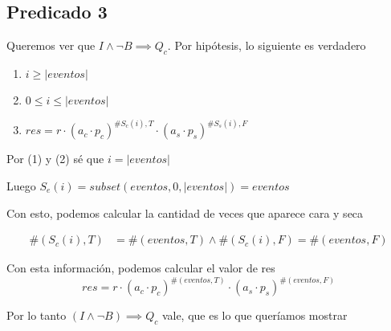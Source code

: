 \documentclass[../document.tex]{subfiles}
\begin{document}
\subsection*{Predicado 3}

Queremos ver que $I\land \neg B \implies Q_c$. Por hipótesis, lo siguiente es verdadero

\begin{enumerate}
    \item $i \geq |eventos|$
    \item $0\leq i \leq |eventos|$
    \item $res=r\cdot (a_c\cdot p_c)^{\#S_c(i),T}\cdot (a_s\cdot p_s)^{\#S_s(i),F}$
\end{enumerate}

Por (1) y (2) sé que $i=|eventos|$

Luego $S_e(i)=subset(eventos, 0, |eventos|)=eventos$

Con esto, podemos calcular la cantidad de veces que aparece cara y seca 

\begin{equation*}
\begin{split}
    \#(S_c(i),T)&=\#(eventos,T)\land \#(S_c(i),F)=\#(eventos,F)
\end{split}
\end{equation*}

Con esta información, podemos calcular el valor de res
\begin{equation*}
res=r\cdot (a_c\cdot p_c)^{\#(eventos,T)}\cdot (a_s\cdot p_s)^{\#(eventos,F)}
\end{equation*}

Por lo tanto $(I\land \neg B)\implies Q_c$ vale, que es lo que queríamos mostrar
\end{document}
